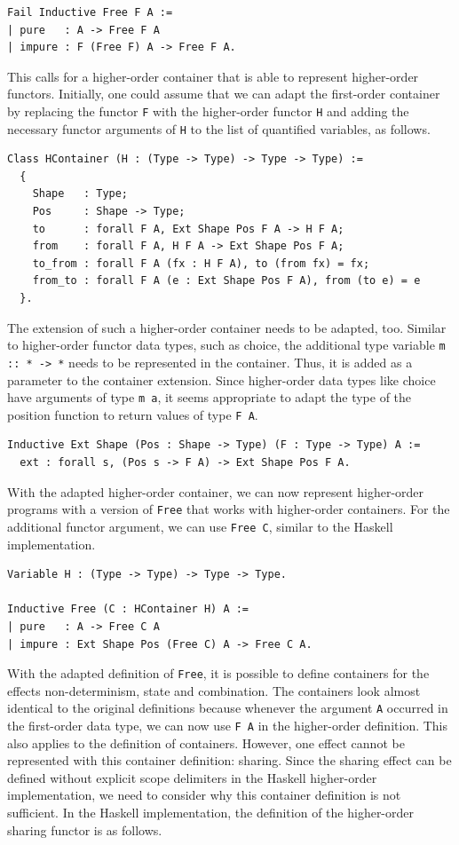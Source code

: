 \documentclass[a4paper, 11pt, fleqn, twoside, abstract=on]{scrreprt}
\newcommand{\hinl}[1]{\texttt{#1}}
\newcommand{\cinl}[1]{\texttt{#1}}
\begin{document}
\begin{verbatim}
Fail Inductive Free F A :=
| pure   : A -> Free F A
| impure : F (Free F) A -> Free F A.
\end{verbatim}

This calls for a higher-order container that is able to represent higher-order functors.
Initially, one could assume that we can adapt the first-order container by replacing the functor \cinl{F} with the higher-order functor \cinl{H} and adding the necessary functor arguments of \cinl{H} to the list of quantified variables, as follows.

\begin{verbatim}
Class HContainer (H : (Type -> Type) -> Type -> Type) :=
  {
    Shape   : Type;
    Pos     : Shape -> Type;
    to      : forall F A, Ext Shape Pos F A -> H F A;
    from    : forall F A, H F A -> Ext Shape Pos F A;
    to_from : forall F A (fx : H F A), to (from fx) = fx;
    from_to : forall F A (e : Ext Shape Pos F A), from (to e) = e
  }.
\end{verbatim}

The extension of such a higher-order container needs to be adapted, too.
Similar to higher-order functor data types, such as choice, the additional type variable \hinl{m :: * -> *} needs to be represented in the container.
Thus, it is added as a parameter to the container extension.
Since higher-order data types like choice have arguments of type \hinl{m a}, it seems appropriate to adapt the type of the position function to return values of type \cinl{F A}.

\begin{verbatim}
Inductive Ext Shape (Pos : Shape -> Type) (F : Type -> Type) A := 
  ext : forall s, (Pos s -> F A) -> Ext Shape Pos F A.
\end{verbatim}

With the adapted higher-order container, we can now represent higher-order programs with a version of \cinl{Free} that works with higher-order containers.
For the additional functor argument, we can use \cinl{Free C}, similar to the Haskell implementation.

\begin{verbatim}
Variable H : (Type -> Type) -> Type -> Type.

Inductive Free (C : HContainer H) A :=
| pure   : A -> Free C A
| impure : Ext Shape Pos (Free C) A -> Free C A.
\end{verbatim}

With the adapted definition of \cinl{Free}, it is possible to define containers for the effects non-determinism, state and combination.
The containers look almost identical to the original definitions because whenever the argument \cinl{A} occurred in the first-order data type, we can now use \cinl{F A} in the higher-order definition.
This also applies to the definition of containers.
However, one effect cannot be represented with this container definition: sharing.
Since the sharing effect can be defined without explicit scope delimiters in the Haskell higher-order implementation, we need to consider why this container definition is not sufficient.
In the Haskell implementation, the definition of the higher-order sharing functor is as follows.
\end{document}
